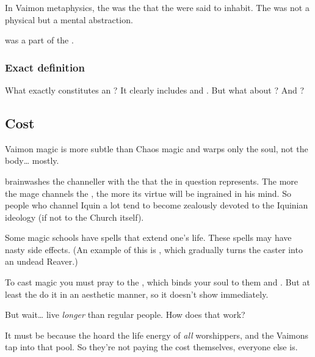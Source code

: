 \subsubsection{\Empyrean}
\index{\empyrean}
In Vaimon metaphysics, the \quo{\empyrean} was the  that the \Archons{} were said to inhabit. 
The \empyrean{} was not a physical  but a mental abstraction. 

 was a part of the \empyrean. 





\subsubsection{Exact definition}
What exactly constitutes an \Archon?
It clearly includes \sephiroth and \qliphoth.
But what about ? 
And \malachim?







\subsection{Cost}

Vaimon magic is more subtle than Chaos magic and warps only the soul, not the body\ldots{} mostly.

\Iquin{} brainwashes the channeller with the  that the \Sephirah{} in question represents. The more the mage channels the \Sephirah{}, the more its virtue will be ingrained in his mind. So people who channel Iquin a lot tend to become zealously devoted to the Iquinian ideology (if not to the Church itself). 

Some magic schools have spells that extend one's life. 
These spells may have nasty side effects. 
(An example of this is , which gradually turns the caster into an undead Reaver.) 

To cast  magic you must pray to the \sephiroth, which binds your soul to them and . But at least the \sephiroth{} do it in an aesthetic manner, so it doesn't show immediately. 

But wait\ldots{}  live \emph{longer} than regular people. How does that work? 

It must be because the \sephiroth{} hoard the life energy of \emph{all} worshippers, and the Vaimons tap into that pool. So they're not paying the cost themselves, everyone else is. 

